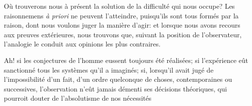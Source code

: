 \documentclass[11pt,a4paper]{article}
\begin{document}
Où trouverons nous à présent la solution de la difficulté qui nous
occupe? Les raisonnemens \emph{à priori} ne peuvent l'atteindre, puisqu'ils
sont tous formés par la raison, dont nous voulons juger la manière
d'agir: et lorsque nous \struck{\ill{}} avons recours aux preuves
extérieures, nous trouvons que, suivant la position de l'observateur,
 l'analogie le conduit aux opinions
les plus contraires.

Ah! si les conjectures de l'homme eussent toujours été
réalisées; si l'expérience eût sanctionné tous les systèmes qu'il a
imaginés; si, lorsqu'il avait jugé de l'impossibilité d'un fait, d'un
ordre quelconque de choses, contemporaines ou successives, l'observation
n'eût jamais démenti ses décisions théoriques, qui pourroit douter de
l'absolutisme de nos nécessités
\end{document}
